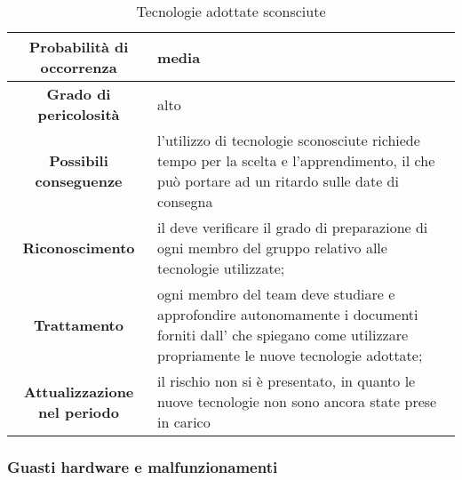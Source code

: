 \documentclass[PianoDiProgetto.tex]{subfiles}
\begin{document}
	\begin{table}
		\begin{center}
			\begin{tabular}{ | c | p{10cm} |}
				\hline
				\textbf{Probabilità di occorrenza} & media  \\ \hline
				\textbf{Grado di pericolosità} & alto \\ \hline
				\textbf{Possibili conseguenze} & l'utilizzo di tecnologie sconosciute richiede tempo per la scelta e l'apprendimento, il che può portare ad un ritardo sulle date di consegna \\ \hline
				\textbf{Riconoscimento} & il \RESP{} deve verificare il grado di preparazione di ogni membro del gruppo relativo alle tecnologie utilizzate; \\ \hline
				\textbf{Trattamento} &  ogni membro del team deve studiare e approfondire autonomamente i documenti forniti dall'\AMM{} che spiegano come utilizzare propriamente le nuove tecnologie adottate; \\ \hline
				\textbf{Attualizzazione nel periodo} &  il rischio non si è presentato, in quanto le nuove tecnologie non sono ancora state prese in carico \\
				\hline
				
			\end{tabular}
		\caption{Tecnologie adottate sconsciute}
		\end{center}	
	\end{table}

	
	\subsubsection{Guasti hardware e malfunzionamenti }
		\label{sec:ghs}
\end{document}
